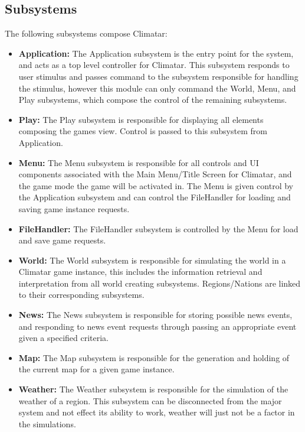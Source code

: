 \documentclass[]{article}
\begin{document}
\subsection{Subsystems}
\label{sub:subsystems}
The following subsystems compose Climatar:
\begin{itemize}
	\item \textbf{Application:} The Application subsystem is the entry point for the system, and acts as a top level controller for Climatar. This subsystem responds to user stimulus and passes command to the subsystem responsible for handling the stimulus, however this module can only command the World, Menu, and Play subsystems, which compose the control of the remaining subsystems.
	
	\item \textbf{Play:} The Play subsystem is responsible for displaying all elements composing the games view. Control is passed to this subsystem from Application.
	
	\item \textbf{Menu:} The Menu subsystem is responsible for all controls and UI components associated with the Main Menu/Title Screen for Climatar, and the game mode the game will be activated in. The Menu is given control by the Application subsystem and can control the FileHandler for loading and saving game instance requests.
	
	\item \textbf{FileHandler:} The FileHandler subsystem is controlled by the Menu for load and save game requests. 
	
	\item \textbf{World:} The World subsystem is responsible for simulating the world in a Climatar game instance, this includes the information retrieval and interpretation from all world creating subsystems. Regions/Nations are linked to their corresponding subsystems.
	
	\item \textbf{News:} The News subsystem is responsible for storing possible news events, and responding to news event requests through passing an appropriate event given a specified criteria.
	
	\item \textbf{Map:} The Map subsystem is responsible for the generation and holding of the current map for a given game instance.
	
	\item \textbf{Weather:} The Weather subsystem is responsible for the simulation of the weather of a region. This subsystem can be disconnected from the major system and not effect its ability to work, weather will just not be a factor in the simulations.
	

\end{itemize}
\end{document}
